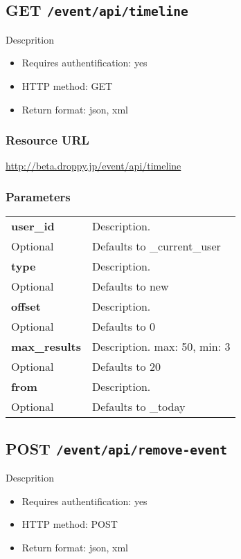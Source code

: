 \documentclass[11pt,a4paper]{article}
\newcommand{\content}[1]{\begin{minipage}{10cm}\vspace{2mm}#1\vspace{2mm}\end{minipage}}
\begin{document}
      \newpage
      
      
  \subsection*{GET {\tt /event/api/timeline}}
  Descprition
  \begin{itemize}
  \item Requires authentification: yes
  \item HTTP method: GET
  \item Return format: json, xml
  \end{itemize}
  \subsubsection*{Resource URL}
  \url{http://beta.droppy.jp/event/api/timeline}
  \subsubsection*{Parameters}
  \begin{table}[h]
    \begin{center}
      \begin{tabular}{l l}
        \hline 
      \textbf{user\_id} & \content{Description. }
      \\
      Optional & Defaults to \_current\_user\\
      \hline
      \textbf{type} & \content{Description. }
      \\
      Optional & Defaults to new\\
      \hline
      \textbf{offset} & \content{Description. }
      \\
      Optional & Defaults to 0\\
      \hline
      \textbf{max\_results} & \content{Description. max: 50, min: 3}
      \\
      Optional & Defaults to 20\\
      \hline
      \textbf{from} & \content{Description. }
      \\
      Optional & Defaults to \_today\\
      \hline
      \end{tabular}
    \end{center}
  \end{table}
  
      \newpage
      
      
  \subsection*{POST {\tt /event/api/remove-event}}
  Descprition
  \begin{itemize}
  \item Requires authentification: yes
  \item HTTP method: POST
  \item Return format: json, xml
  \end{itemize}
\end{document}
